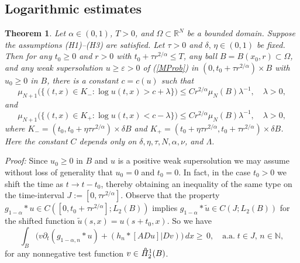 \documentclass[10pt]{article}
\newtheorem{satz}{Theorem}[section]
\newcommand{\iR}{\mathbb{R}}
\newcommand{\iN}{\mathbb{N}}
\newcommand{\oH}{\hspace*{0.39em}\raisebox{0.6ex}{\textdegree}\hspace{-0.72em}H}
\begin{document}
\subsection{Logarithmic estimates}
\begin{satz} \label{logest}
Let $\alpha\in(0,1)$, $T>0$, and $\Omega\subset \iR^N$ be a bounded
domain. Suppose the assumptions (H1)--(H3) are satisfied. Let
$\tau>0$ and $\delta,\,\eta\in(0,1)$ be fixed. Then for any $t_0\ge
0$ and $r>0$ with $t_0+\tau r^{2/\alpha}\le T$, any ball
$B=B(x_0,r)\subset\Omega$, and any weak supersolution $u\ge
\varepsilon>0$ of (\ref{MProb}) in $(0,t_0+\tau r^{2/\alpha})\times
B$ with $u_0\ge 0$ in $B$, there is a constant $c=c(u)$ such that
\begin{equation} \label{logestleft}
\mu_{N+1}\big(\{(t,x)\in K_-: \log u(t,x)>c+\lambda\}\big)\le C
r^{2/\alpha} \mu_N(B)\lambda^{-1},\quad \lambda>0,
\end{equation}
and
\begin{equation} \label{logestright}
\mu_{N+1}\big(\{(t,x)\in K_+: \log u(t,x)<c-\lambda\}\big)\le C
r^{2/\alpha} \mu_N(B)\lambda^{-1},\quad \lambda>0,
\end{equation}
where $K_-=(t_0,t_0+\eta \tau r^{2/\alpha})\times \delta B$ and
$K_+=(t_0+\eta \tau r^{2/\alpha},t_0+\tau r^{2/\alpha})\times
\delta B$. Here the constant $C$ depends only on $\delta, \eta,
\tau, N, \alpha, \nu$, and $\Lambda$.
\end{satz}
{\em Proof:} Since $u_0\ge 0$ in $B$ and $u$ is a positive weak
supersolution we may assume without loss of generality that $u_0=0$
and $t_0=0$. In fact, in the case $t_0>0$ we shift the time as $t\to
t-t_0$, thereby obtaining an inequality of the same type on the
time-interval $J:=[0,\tau r^{2/\alpha}]$. Observe that the property
$g_{1-\alpha}\ast u\in C([0,t_0+\tau r^{2/\alpha}];L_2(B))$ implies
$g_{1-\alpha}\ast \tilde{u}\in C(J;L_2(B))$ for the shifted function
$\tilde{u}(s,x)=u(s+t_0,x)$. So we have
\begin{equation} \label{log1}
\int_B \Big(v \partial_t(g_{1-\alpha,n}\ast u)+(h_n\ast
[ADu]|Dv)\Big)\,dx \ge \,0,\quad\mbox{a.a.}\;t\in J,\,n\in \iN,
\end{equation}
for any nonnegative test function $v\in \oH^1_2(B)$.
\end{document}
